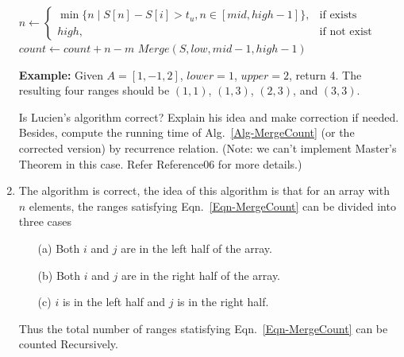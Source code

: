 \documentclass[12pt,a4paper]{article}
\makeatletter
\newtheorem*{solution}{Solution}
\theoremstyle{definition}
\renewenvironment{solution}[1][Solution] {\par\pushQED{\qed}\normalfont\topsep6\p@\@plus6\p@\relax\trivlist\item[\hskip\labelsep\bfseries#1\@addpunct{.}]\ignorespaces}{\popQED\endtrivlist\@endpefalse} \makeatother
\makeatother
\begin{document}
\begin{enumerate}
\begin{minipage}[t]{0.90\textwidth}
\begin{algorithm}[H]
{			$n \leftarrow \left \{ \begin{array}{ll}
            \min\{n \mid S[n]-S[i] > t_u, n \in [mid, high-1]\}, & \text{if exists}\\
            high, & \text{if not exist}
            \end{array}\right.$
			$count \leftarrow count+n-m$\;
		}
		$Merge(S,low,mid-1,high-1)$  
		
		\;
		
	\end{algorithm}
\end{minipage}

    {\color{purple}\textbf{Example:} Given $A = [1,-1,2]$, $lower = 1$, $upper = 2$, return 4. The resulting four ranges should be $(1,1)$, $(1,3)$, $(2,3)$, and $(3,3)$.}

    Is Lucien's algorithm correct? Explain his idea and make correction if needed. Besides, compute the running time of Alg.~\ref{Alg-MergeCount} (or the corrected version) by recurrence relation. {\color{blue}(Note: we can't implement Master's Theorem in this case. Refer Reference06 for more details.)}
	\begin{solution}
		The algorithm is correct, the idea of this algorithm is that for an array with $n$ elements, the ranges satisfying Eqn.~\eqref{Eqn-MergeCount} can be divided into three cases 
		\begin{itemize}
			\item[(a)] Both $i$ and $j$ are in the left half of the array.
			\item[(b)] Both $i$ and $j$ are in the right half of the array.
			\item[(c)] $i$ is in the left half and $j$ is in the right half.
		\end{itemize}
	Thus the total number of ranges statisfying Eqn.~\eqref{Eqn-MergeCount} can be counted Recursively.
	

\end{solution}
\end{enumerate}
\end{document}
